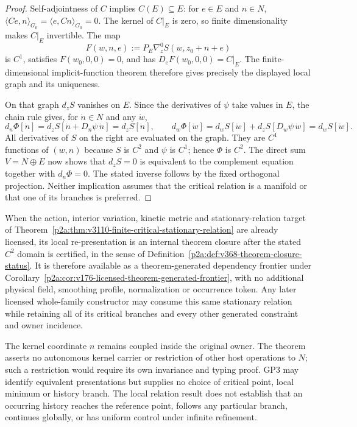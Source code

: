 \documentclass[12pt,a4paper]{article}
\begin{document}
\begin{proof}
Self-adjointness of $C$ implies $C(E)\subseteq E$: for $e\in E$ and
$n\in N$, $\langle Ce,n\rangle_{G_0}=\langle e,Cn\rangle_{G_0}=0$.
The kernel of $C|_E$ is zero, so finite dimensionality makes $C|_E$ invertible.
The map
\[
 F(w,n,e):=P_E\nabla_z^0S(w,z_0+n+e)
\]
is $C^1$, satisfies $F(w_0,0,0)=0$, and has
$D_eF(w_0,0,0)=C|_E$.  The finite-dimensional implicit-function theorem
therefore gives precisely the displayed local graph and its uniqueness.

On that graph $d_zS$ vanishes on $E$.  Since the derivatives of $\psi$ take
values in $E$, the chain rule gives, for $\dot n\in N$ and any $\dot w$,
\[
 d_n\Phi[\dot n]
 =d_zS[\dot n+D_n\psi\,\dot n]=d_zS[\dot n],
 \qquad
 d_w\Phi[\dot w]
 =d_wS[\dot w]+d_zS[D_w\psi\,\dot w]=d_wS[\dot w].
\]
All derivatives of $S$ on the right are evaluated on the graph.  They are
$C^1$ functions of $(w,n)$ because $S$ is $C^2$ and $\psi$ is $C^1$;
hence $\Phi$ is $C^2$.  The direct sum $V=N\oplus E$ now shows that
$d_zS=0$ is equivalent to the complement equation together with
$d_n\Phi=0$.  The stated inverse follows by the fixed orthogonal projection.
Neither implication assumes that the critical relation is a manifold or
that one of its branches is preferred.
\end{proof}

\begin{corollary}
\label{p2a:cor:v3110-critical-relation-owner-reuse}
When the action, interior variation, kinetic metric and stationary-relation
target of Theorem~\ref{p2a:thm:v3110-finite-critical-stationary-relation}
are already licensed, its local re-presentation is an internal theorem
closure after the stated $C^2$ domain is certified, in the sense of
Definition~\ref{p2a:def:v368-theorem-closure-status}.  It is therefore
available as a theorem-generated dependency frontier under
Corollary~\ref{p2a:cor:v176-licensed-theorem-generated-frontier}, with no
additional physical field, smoothing profile, normalization or occurrence
token.  Any later licensed whole-family constructor may consume this same
stationary relation while retaining all of its critical branches and every
other generated constraint and owner incidence.

The kernel coordinate $n$ remains coupled inside the original owner.  The
theorem asserts no autonomous kernel carrier or restriction of other host
operations to $N$; such a restriction would require its own invariance and
typing proof.  GP3 may identify equivalent presentations but supplies no
choice of critical point, local minimum or history branch.  The local
relation result does not establish that an occurring history reaches the
reference point, follows any particular branch, continues globally, or has
uniform control under infinite refinement.
\end{corollary}
\end{document}

